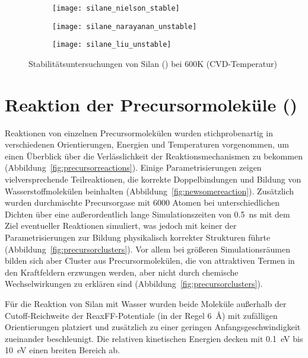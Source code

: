\begin{figure}[b!h]

  \captionsetup[subfigure]{singlelinecheck=false}
  \def\subfigwidth{0.32\textwidth}
  \begin{subfigure}[t]{3.5cm}
    \texttt{[image: silane\_nielson\_stable]}
  \end{subfigure}
  \hfill
  \begin{subfigure}[t]{4.5cm}
    \texttt{[image: silane\_narayanan\_unstable]}
  \end{subfigure}
  \hfill
  \begin{subfigure}[t]{5cm}
    \texttt{[image: silane\_liu\_unstable]}
  \end{subfigure}

  \caption[Stabilitätsuntersuchungen von Silan]{
    Stabilitätsuntersuchungen von Silan () bei 600K (CVD-Temperatur)
  }
  \label{fig:silanestability}

\end{figure}

\section{Reaktion der Precursormoleküle ()}

Reaktionen von einzelnen Precursormolekülen wurden stichprobenartig in verschiedenen Orientierungen, Energien und Temperaturen vorgenommen, um einen Überblick über die Verlässlichkeit der Reaktionsmechanismen zu bekommen (Abbildung~\ref{fig:precursorreactions}).
Einige Parametrisierungen zeigen vielversprechende Teilreaktionen, die korrekte Doppelbindungen und Bildung von Wasserstoffmolekülen beinhalten (Abbildung~\ref{fig:newsomereaction}).
Zusätzlich wurden durchmischte Precursorgase mit \num{6000} Atomen bei unterschiedlichen Dichten über eine außerordentlich lange Simulationszeiten von \SI{0.5}{\nano\second} mit dem Ziel eventueller Reaktionen simuliert, was jedoch mit keiner der Parametrisierungen zur Bildung physikalisch korrekter Strukturen führte (Abbildung~\ref{fig:precursorclusters}).
Vor allem bei größeren Simulationsräumen bilden sich aber Cluster aus Precursormolekülen, die von attraktiven Termen in den Kraftfeldern erzwungen werden, aber nicht durch chemische Wechselwirkungen zu erklären sind (Abbildung~\ref{fig:precursorclusters}).

Für die Reaktion von Silan mit Wasser wurden beide Moleküle außerhalb der Cutoff-Reich\-weite der ReaxFF-Potentiale (in der Regel \SI{6}{\angstrom}) mit zufälligen Orientierungen platziert und zusätzlich zu einer geringen Anfangsgeschwindigkeit zueinander beschleunigt.
Die relativen kinetischen Energien decken mit \SI{0.1}{\electronvolt} bis \SI{10}{\electronvolt}  einen breiten Bereich ab.

